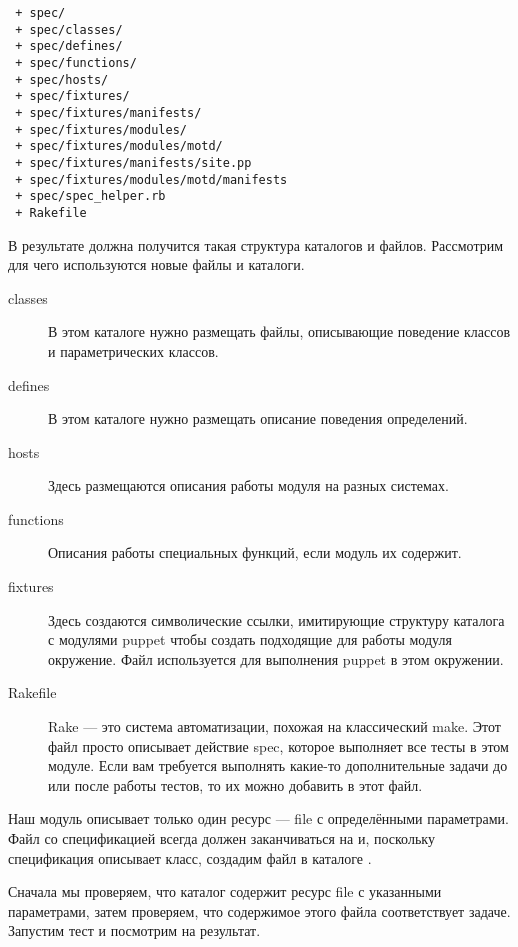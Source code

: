 \begin{verbatim}
 + spec/
 + spec/classes/
 + spec/defines/
 + spec/functions/
 + spec/hosts/
 + spec/fixtures/
 + spec/fixtures/manifests/
 + spec/fixtures/modules/
 + spec/fixtures/modules/motd/
 + spec/fixtures/manifests/site.pp
 + spec/fixtures/modules/motd/manifests
 + spec/spec_helper.rb
 + Rakefile
\end{verbatim}

В результате должна получится такая структура каталогов и файлов. Рассмотрим для чего используются новые файлы и каталоги.


\begin{description}
\item[classes] В этом каталоге нужно размещать файлы, описывающие поведение классов и параметрических классов.
\item[defines] В этом каталоге нужно размещать описание поведения определений.
\item[hosts] Здесь размещаются описания работы модуля на разных системах.
\item[functions] Описания работы специальных функций, если модуль их содержит.
\item[fixtures] Здесь создаются символические ссылки, имитирующие структуру каталога с модулями puppet чтобы создать подходящие для работы модуля окружение. Файл  используется для выполнения puppet в этом окружении.
\item[Rakefile] Rake --- это система автоматизации, похожая на классический make. Этот файл просто описывает действие spec, которое выполняет все тесты в этом модуле. Если вам требуется выполнять какие-то дополнительные задачи до или после работы тестов, то их можно добавить в этот файл.
\end{description}

Наш модуль описывает только один ресурс --- file с определёнными параметрами. Файл со спецификацией всегда должен заканчиваться на  и, поскольку спецификация описывает класс, создадим файл в каталоге .



Сначала мы проверяем, что каталог содержит ресурс file с указанными параметрами, затем проверяем, что содержимое этого файла соответствует задаче. Запустим тест и посмотрим на результат.



